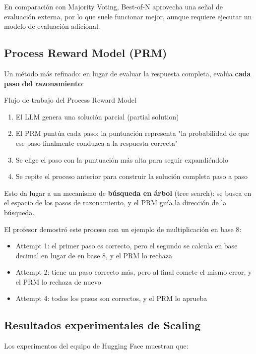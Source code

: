 \documentclass[a4paper]{article}
\begin{document}
En comparación con Majority Voting, Best-of-N aprovecha una señal de evaluación externa, por lo que suele funcionar mejor, aunque requiere ejecutar un modelo de evaluación adicional.

\subsection{Process Reward Model (PRM)}

Un método más refinado: en lugar de evaluar la respuesta completa, evalúa \textbf{cada paso del razonamiento}:

\begin{importantbox}{Flujo de trabajo del Process Reward Model}
\begin{enumerate}
    \item El LLM genera una solución parcial (partial solution)
    \item El PRM puntúa cada paso: la puntuación representa "la probabilidad de que ese paso finalmente conduzca a la respuesta correcta"
    \item Se elige el paso con la puntuación más alta para seguir expandiéndolo
    \item Se repite el proceso anterior para construir la solución completa paso a paso
\end{enumerate}
Esto da lugar a un mecanismo de \textbf{búsqueda en árbol} (tree search): se busca en el espacio de los pasos de razonamiento, y el PRM guía la dirección de la búsqueda.
\end{importantbox}

El profesor demostró este proceso con un ejemplo de multiplicación en base 8:

\begin{itemize}
    \item Attempt 1: el primer paso es correcto, pero el segundo se calcula en base decimal en lugar de en base 8, y el PRM lo rechaza
    \item Attempt 2: tiene un paso correcto más, pero al final comete el mismo error, y el PRM lo rechaza de nuevo
    \item Attempt 4: todos los pasos son correctos, y el PRM lo aprueba
\end{itemize}

\subsection{Resultados experimentales de Scaling}

Los experimentos del equipo de Hugging Face muestran que:
\end{document}
